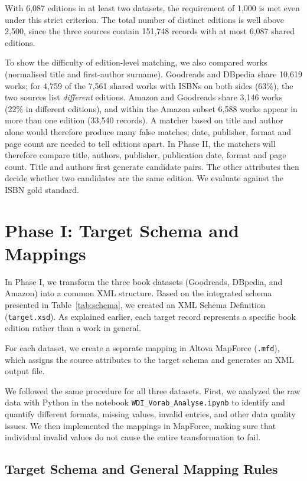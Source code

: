 \documentclass[runningheads]{llncs}
\begin{document}
With 6,087 editions in at least two datasets, the requirement of 1,000 is met
even under this strict criterion. The total number of distinct editions is
well above 2,500, since the three sources contain 151,748 records with at most
6,087 shared editions.

To show the difficulty of edition-level matching, we also compared works
(normalised title and first-author surname). Goodreads and DBpedia share
10,619 works; for 4,759 of the 7,561 shared works with ISBNs on both sides
(63\%), the two sources list \emph{different} editions. Amazon and Goodreads
share 3,146 works (22\% in different editions), and within the Amazon subset
6,588 works appear in more than one edition (33,540 records). A matcher based
on title and author alone would therefore produce many false matches; date,
publisher, format and page count are needed to tell editions apart.
In Phase II, the matchers will therefore compare title, authors, publisher, publication date, format and page count.
Title and authors first generate candidate pairs. The other attributes then decide whether two candidates are the same edition.
We evaluate against the ISBN gold standard.


\section{Phase I: Target Schema and Mappings}

In Phase I, we transform the three book datasets (Goodreads,
DBpedia, and Amazon) into a common XML structure. Based on the
integrated schema presented in Table~\ref{tab:schema}, we created
an XML Schema Definition (\texttt{target.xsd}). As explained
earlier, each target record represents a specific book edition
rather than a work in general.

For each dataset, we create a separate mapping in Altova MapForce
(\texttt{.mfd}), which assigns the source attributes to the
target schema and generates an XML output file.

We followed the same procedure for all three datasets. First,
we analyzed the raw data with Python in the notebook
\texttt{WDI\_Vorab\_Analyse.ipynb} to identify and quantify
different formats, missing values, invalid entries, and other
data quality issues. We then implemented the mappings in
MapForce, making sure that individual invalid values do not
cause the entire transformation to fail.


\subsection{Target Schema and General Mapping Rules}
\end{document}
